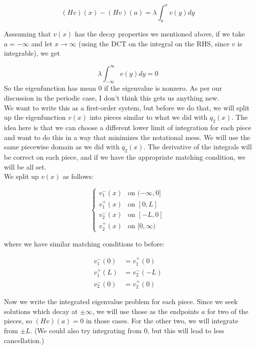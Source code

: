 \documentclass[12pt]{article}
\begin{document}
\begin{equation}\label{inteigproblem}
(Hv)(x) - (Hv)(a) = \lambda \int_{a}^x v(y) dy
\end{equation}

Asssuming that $v(x)$ has the decay properties we mentioned above, if we take $a = -\infty$ and let $x \rightarrow \infty$ (using the DCT on the integral on the RHS, since $v$ is integrable), we get

\[
\lambda \int_{-\infty}^\infty v(y) dy = 0
\]
So the eigenfunction has mean 0 if the eigenvalue is nonzero. As per our discussion in the periodic case, I don't think this gets us anything new.\\

We want to write this as a first-order system, but before we do that, we will split up the eigenfunction $v(x)$ into pieces similar to what we did with $q_2(x)$. The idea here is that we can choose a different lower limit of integration for each piece and want to do this in a way that minimizes the notational mess. We will use the same piecewise domain as we did with $q_2(x)$. The derivative of the integrals will be correct on each piece, and if we have the appropriate matching condition, we will be all set. \\

We split up $v(x)$ as follows:

\begin{equation}\label{splitv}
\begin{cases}
v_1^-(x) & \text{on } (-\infty, 0]  \\
v_1^+(x) & \text{on } [0, L]  \\
v_2^-(x) & \text{on } [-L, 0] \\
v_2^+(x) & \text{on } [0, \infty) 
\end{cases}
\end{equation}

where we have similar matching conditions to before:

\begin{align}\label{match}
v_1^-(0) &= v_1^+(0) \\
v_1^+(L) &= v_2^-(-L) \\
v_2^-(0) &= v_2^+(0)
\end{align}

Now we write the integrated eigenvalue problem for each piece. Since we seek solutions which decay at $\pm \infty$, we will use those as the endpoints $a$ for two of the pieces, so $(Hv)(a) = 0$ in those cases. For the other two, we will integrate from $\pm L$. (We could also try integrating from 0, but this will lead to less cancellation.)
\end{document}
